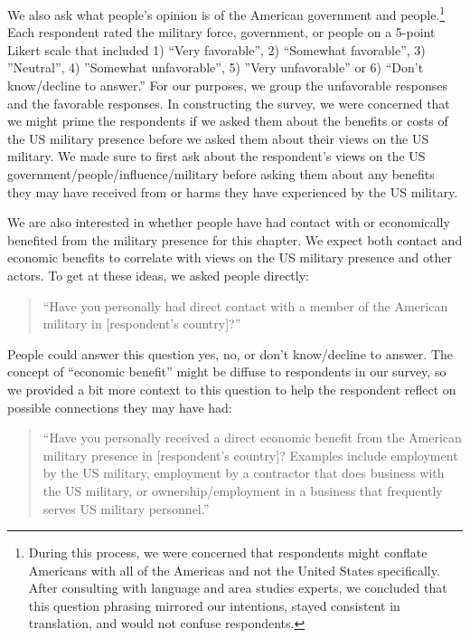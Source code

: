 We also ask what people's opinion is of the American government and people.\footnote{During this process, we were concerned that respondents might conflate Americans with all of the Americas and not the United States specifically. After consulting with language and area studies experts, we concluded that this question phrasing mirrored our intentions, stayed consistent in translation, and would not confuse respondents.} Each respondent rated the military force, government, or people on a 5-point Likert scale that included 1) ``Very favorable'', 2) ``Somewhat favorable'', 3) ''Neutral'', 4) ''Somewhat unfavorable'', 5) ''Very unfavorable'' or 6) ``Don't know/decline to answer.'' For our purposes, we group the unfavorable responses and the favorable responses. In constructing the survey, we were concerned that we might prime the respondents if we asked them about the benefits or costs of the US military presence before we asked them about their views on the US military. We made sure to first ask about the respondent's views on the US government/people/influence/military before asking them about any benefits they may have received from or harms they have experienced by the US military.

We are also interested in whether people have had contact with or economically  benefited from the military presence for this chapter. We expect both contact and economic benefits to correlate with views on the US military presence and other actors. To get at these ideas, we asked people directly:

\begin{quote}
	``Have you personally had direct contact with a member of the American military in [respondent's country]?''
\end{quote}

People could answer this question yes, no, or don't know/decline to answer. The concept of ``economic benefit'' might be diffuse to respondents in our survey, so we provided a bit more context to this question to help the respondent reflect on possible connections they may have had:

\begin{quote}
	``Have you personally received a direct economic benefit from the American military presence in [respondent's country]? Examples include employment by the US military, employment by a contractor that does business with the US military, or ownership/employment in a business that frequently serves US military personnel.''
\end{quote}

